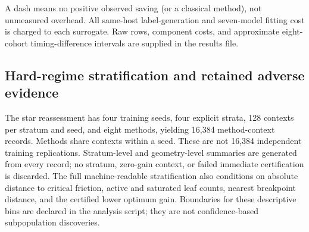 \documentclass[11pt,letterpaper]{article}
\theoremstyle{definition}
\newcommand{\1}{\mathbf 1}
\begin{document}
\begin{table}[p]
\par\medskip\begin{minipage}{\textwidth}A dash means no positive observed saving (or a classical method), not unmeasured overhead. All same-host label-generation and seven-model fitting cost is charged to each surrogate. Raw rows, component costs, and approximate eight-cohort timing-difference intervals are supplied in the results file.\end{minipage}
\end{table}


\subsection{Hard-regime stratification and retained adverse evidence}
The star reassessment has four training seeds, four explicit strata, 128 contexts per stratum and seed, and eight methods, yielding 16,384 method-context records. Methods share contexts within a seed. These are not 16,384 independent training replications. Stratum-level and geometry-level summaries are generated from every record; no stratum, zero-gain context, or failed immediate certification is discarded. The full machine-readable stratification also conditions on absolute distance to critical friction, active and saturated leaf counts, nearest breakpoint distance, and the certified lower optimum gain. Boundaries for these descriptive bins are declared in the analysis script; they are not confidence-based subpopulation discoveries.
\end{document}
